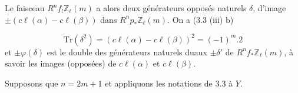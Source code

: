 \begin{center}
\end{center}
Le faisceau $R^n f_{!} \mathbb{Z}_\ell(m)$ a alors deux générateurs opposés naturels $\delta$, d'image $\pm (c\ell(\alpha) - c\ell(\beta))$ dans $R^n p_{*} \mathbb{Z}_\ell(m)$. On a (3.3 (iii) b)

\begin{equation*}
\mathrm{Tr}(\delta^2) = (c\ell(\alpha) - c\ell(\beta))^2 = (-1)^m . 2
\end{equation*}
et $\pm \varphi(\delta)$ est le double des générateurs naturels duaux $\pm \delta'$ de $R^n f_{*} \mathbb{Z}_\ell(m)$, à savoir les images (opposées) de $c\ell(\alpha)$ et $c\ell(\beta)$.

Supposons que $n = 2m + 1$ et appliquons les notations de 3.3 à $Y$.

